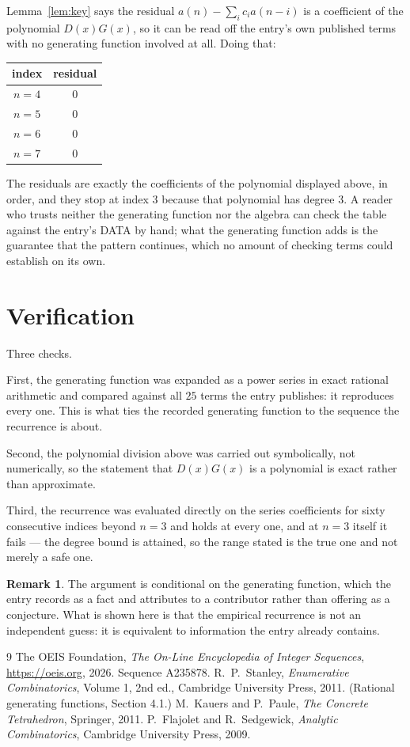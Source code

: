 \documentclass[11pt,a4paper]{article}
\theoremstyle{plain}
\theoremstyle{definition}
\newtheorem{remark}[theorem]{Remark}
\begin{document}
Lemma~\ref{lem:key} says the residual $a(n)-\sum_ic_ia(n-i)$ is a coefficient of the
polynomial $D(x)G(x)$, so it can be read off the entry's own published terms with no
generating function involved at all. Doing that:
\begin{center}
\begin{tabular}{cc}
index & residual \\ \hline
$n=4$ & $0$ \\
$n=5$ & $0$ \\
$n=6$ & $0$ \\
$n=7$ & $0$
\end{tabular}
\end{center}
The residuals are exactly the coefficients of the polynomial displayed above, in order, and
they stop at index $3$ because that polynomial has degree $3$. A reader who trusts
neither the generating function nor the algebra can check the table against the entry's DATA
by hand; what the generating function adds is the guarantee that the pattern continues, which
no amount of checking terms could establish on its own.

\section{Verification}

Three checks.

First, the generating function was expanded as a power series in exact rational arithmetic and
compared against all $25$ terms the entry publishes: it reproduces every one. This is
what ties the recorded generating function to the sequence the recurrence is about.

Second, the polynomial division above was carried out symbolically, not numerically, so the
statement that $D(x)G(x)$ is a polynomial is exact rather than approximate.

Third, the recurrence was evaluated directly on the series coefficients for sixty consecutive
indices beyond $n=3$ and holds at every one, and at $n=3$ itself it fails --- the
degree bound is attained, so the range stated is the true one and not merely a safe one.

\begin{remark}
The argument is conditional on the generating function, which the entry records as a fact and
attributes to a contributor rather than offering as a conjecture. What is shown here is that
the empirical recurrence is not an independent guess: it is equivalent to information the
entry already contains.
\end{remark}

\begin{thebibliography}{9}
 The OEIS Foundation, \emph{The On-Line Encyclopedia of Integer
Sequences}, \url{https://oeis.org}, 2026. Sequence A235878.
 R.~P.~Stanley, \emph{Enumerative Combinatorics}, Volume 1, 2nd ed.,
Cambridge University Press, 2011. (Rational generating functions, Section 4.1.)
 M.~Kauers and P.~Paule, \emph{The Concrete Tetrahedron}, Springer, 2011.
 P.~Flajolet and R.~Sedgewick, \emph{Analytic Combinatorics}, Cambridge
University Press, 2009.
\end{thebibliography}
\end{document}
